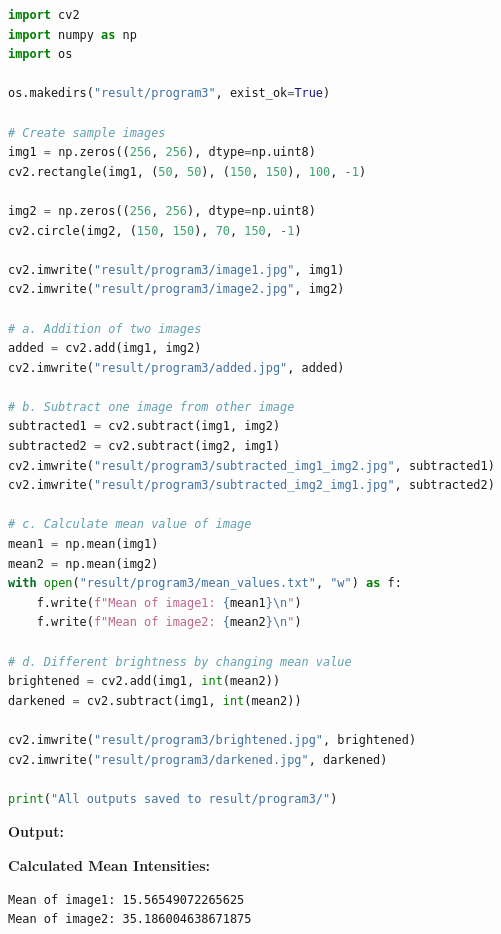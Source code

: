 \documentclass[12pt]{article}
\begin{document}
\begin{lstlisting}[language=Python]
import cv2
import numpy as np
import os

os.makedirs("result/program3", exist_ok=True)

# Create sample images
img1 = np.zeros((256, 256), dtype=np.uint8)
cv2.rectangle(img1, (50, 50), (150, 150), 100, -1)

img2 = np.zeros((256, 256), dtype=np.uint8)
cv2.circle(img2, (150, 150), 70, 150, -1)

cv2.imwrite("result/program3/image1.jpg", img1)
cv2.imwrite("result/program3/image2.jpg", img2)

# a. Addition of two images
added = cv2.add(img1, img2)
cv2.imwrite("result/program3/added.jpg", added)

# b. Subtract one image from other image
subtracted1 = cv2.subtract(img1, img2)
subtracted2 = cv2.subtract(img2, img1)
cv2.imwrite("result/program3/subtracted_img1_img2.jpg", subtracted1)
cv2.imwrite("result/program3/subtracted_img2_img1.jpg", subtracted2)

# c. Calculate mean value of image
mean1 = np.mean(img1)
mean2 = np.mean(img2)
with open("result/program3/mean_values.txt", "w") as f:
    f.write(f"Mean of image1: {mean1}\n")
    f.write(f"Mean of image2: {mean2}\n")

# d. Different brightness by changing mean value
brightened = cv2.add(img1, int(mean2))
darkened = cv2.subtract(img1, int(mean2))

cv2.imwrite("result/program3/brightened.jpg", brightened)
cv2.imwrite("result/program3/darkened.jpg", darkened)

print("All outputs saved to result/program3/")
\end{lstlisting}

\vspace{8pt}
\textbf{\large Output:}

\textbf{\normalsize Calculated Mean Intensities:}
\begin{lstlisting}[style=mystyle, numbers=none]
Mean of image1: 15.56549072265625
Mean of image2: 35.186004638671875
\end{lstlisting}
\vspace{6pt}
\end{document}
